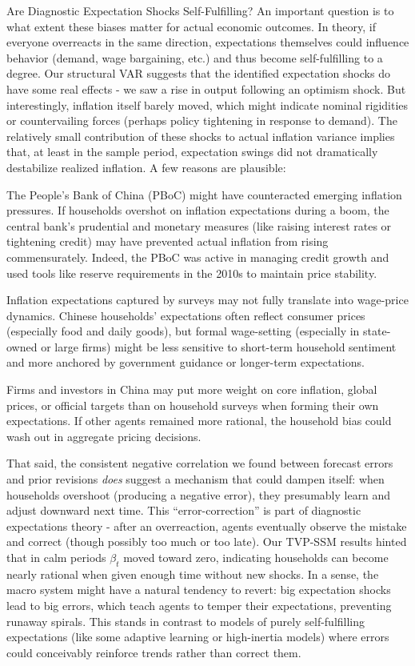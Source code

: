 \documentclass[12pt]{article}
\begin{document}
Are Diagnostic Expectation Shocks Self-Fulfilling? An important question is to what extent these biases matter for actual economic outcomes. In theory, if everyone overreacts in the same direction, expectations themselves could influence behavior (demand, wage bargaining, etc.) and thus become self-fulfilling to a degree. Our structural VAR suggests that the identified expectation shocks do have some real effects - we saw a rise in output following an optimism shock. But interestingly, inflation itself barely moved, which might indicate nominal rigidities or countervailing forces (perhaps policy tightening in response to demand). The relatively small contribution of these shocks to actual inflation variance implies that, at least in the sample period, expectation swings did not dramatically destabilize realized inflation. A few reasons are plausible:

The People's Bank of China (PBoC) might have counteracted emerging inflation pressures. If households overshot on inflation expectations during a boom, the central bank's prudential and monetary measures (like raising interest rates or tightening credit) may have prevented actual inflation from rising commensurately. Indeed, the PBoC was active in managing credit growth and used tools like reserve requirements in the 2010s to maintain price stability.

Inflation expectations captured by surveys may not fully translate into wage-price dynamics. Chinese households' expectations often reflect consumer prices (especially food and daily goods), but formal wage-setting (especially in state-owned or large firms) might be less sensitive to short-term household sentiment and more anchored by government guidance or longer-term expectations.

Firms and investors in China may put more weight on core inflation, global prices, or official targets than on household surveys when forming their own expectations. If other agents remained more rational, the household bias could wash out in aggregate pricing decisions.

That said, the consistent negative correlation we found between forecast errors and prior revisions \textit{does} suggest a mechanism that could dampen itself: when households overshoot (producing a negative error), they presumably learn and adjust downward next time. This “error-correction” is part of diagnostic expectations theory - after an overreaction, agents eventually observe the mistake and correct (though possibly too much or too late). Our TVP-SSM results hinted that in calm periods $\beta_t$ moved toward zero, indicating households can become nearly rational when given enough time without new shocks. In a sense, the macro system might have a natural tendency to revert: big expectation shocks lead to big errors, which teach agents to temper their expectations, preventing runaway spirals. This stands in contrast to models of purely self-fulfilling expectations (like some adaptive learning or high-inertia models) where errors could conceivably reinforce trends rather than correct them.
\end{document}
